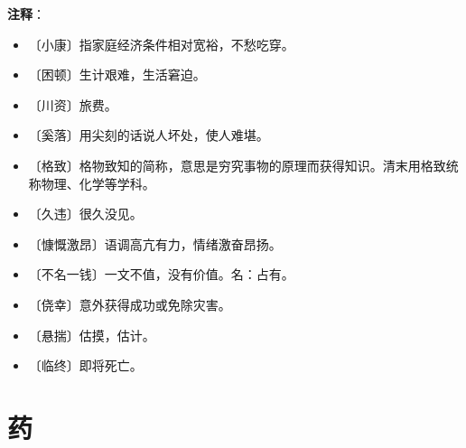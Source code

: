 \documentclass[12pt,UTF-8,openany]{ctexbook}
\begin{document}
\textbf{注释}：

\vspace{-1em}

\begin{itemize}
    \setlength\itemsep{-0.2em}
    \item 〔小康〕指家庭经济条件相对宽裕，不愁吃穿。
    \item 〔困顿〕生计艰难，生活窘迫。
    \item 〔川资〕旅费。
    \item 〔奚落〕用尖刻的话说人坏处，使人难堪。
    \item 〔格致〕格物致知的简称，意思是穷究事物的原理而获得知识。清末用格致统称物理、化学等学科。
    \item 〔久违〕很久没见。
    \item 〔慷慨激昂〕语调高亢有力，情绪激奋昂扬。
    \item 〔不名一钱〕一文不值，没有价值。名：占有。
    \item 〔侥幸〕意外获得成功或免除灾害。
    \item 〔悬揣〕估摸，估计。
    \item 〔临终〕即将死亡。
\end{itemize}

\chapter{药}
\end{document}
